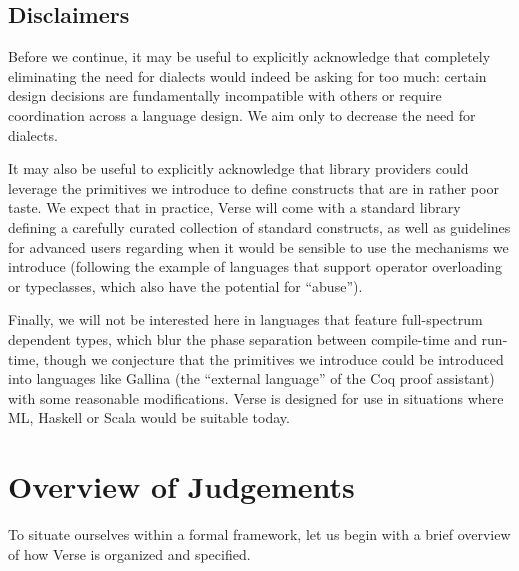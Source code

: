 \subsection{Disclaimers}
Before we continue, it may be useful to explicitly acknowledge that completely eliminating the need for dialects would indeed be asking for too much: certain design decisions are fundamentally incompatible with others or require coordination across a language design. We aim only to decrease the need for dialects.%

It may also be useful to explicitly acknowledge that library providers could leverage the primitives we introduce   to define constructs that are in rather poor taste. We  expect that in practice, Verse will come with a standard library defining a carefully curated collection of standard constructs, as well as guidelines for advanced users regarding when it would be sensible to use the mechanisms we introduce (following the example of languages that support operator overloading or typeclasses, which also have the potential for ``abuse''). %

Finally, we will not be interested here in languages that feature full-spectrum dependent types, which blur the phase separation between compile-time and run-time, though we conjecture that the primitives we introduce could be introduced into languages like Gallina (the ``external language'' of the Coq proof assistant) with some reasonable modifications. Verse is designed for use in situations where ML, Haskell or Scala would be suitable today. %



\section{Overview of Judgements}\label{sec:verse}
To situate ourselves within a formal framework, let us begin with a brief overview of how Verse is organized and specified. %

